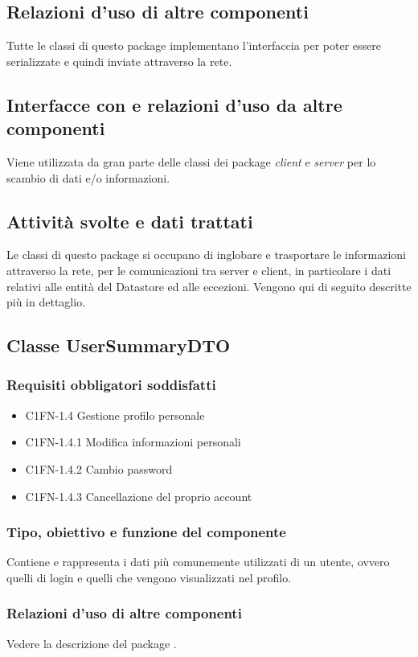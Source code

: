\subsection*{Relazioni d'uso di altre componenti} Tutte le classi di questo
package implementano l'interfaccia  per poter essere
serializzate e quindi inviate attraverso la rete. 
\subsection*{Interfacce con e relazioni d'uso da altre componenti} Viene
utilizzata da gran parte delle classi dei package \emph{client} e \emph{server}
per lo scambio di dati e/o informazioni. 
\subsection*{Attivit\`a svolte e dati trattati}
Le classi di questo package si occupano di inglobare e trasportare
le informazioni attraverso la rete, per le comunicazioni tra server e client,
in particolare i dati relativi alle entit\`a del Datastore ed alle eccezioni.
Vengono qui di seguito descritte pi\`u in dettaglio.

\subsection{Classe UserSummaryDTO}
\subsubsection*{Requisiti obbligatori soddisfatti}
\begin{itemize}
	\item C1FN-1.4 Gestione profilo personale
	\item C1FN-1.4.1 Modifica informazioni personali
	\item C1FN-1.4.2 Cambio password
	\item C1FN-1.4.3 Cancellazione del proprio account
\end{itemize}
\subsubsection*{Tipo, obiettivo e funzione del componente}
Contiene e rappresenta i dati pi\`u comunemente utilizzati di un utente, ovvero
quelli di login e quelli che vengono visualizzati nel profilo. 
\subsubsection*{Relazioni d'uso di altre componenti}
Vedere la descrizione del package .
